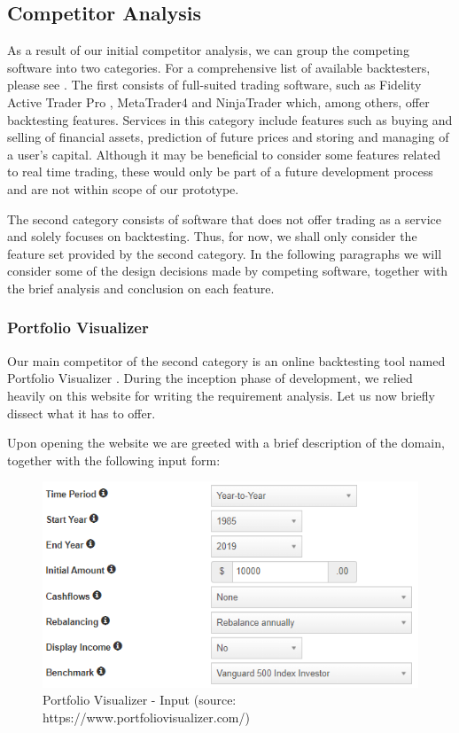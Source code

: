 \documentclass[main.tex]{subfiles}
\begin{document}
\subsection{Competitor Analysis}

As a result of our initial competitor analysis, we can group the competing software into two categories. For a comprehensive list of available backtesters, please see \cite{listofbacktesters}. The first consists of full-suited trading software, such as Fidelity Active Trader Pro \cite{Fidelity}, MetaTrader4 \cite{MetaTrader} and NinjaTrader \cite{NinjaTrader} which, among others, offer backtesting features. Services in this category include features such as buying and selling of financial assets, prediction of future prices and storing and managing of a user's capital. Although it may be beneficial to consider some features related to real time trading, these would only be part of a future development process and are not within scope of our prototype.

The second category consists of software that does not offer trading as a service and solely focuses on backtesting. Thus, for now, we shall only consider the feature set provided by the second category. In the following paragraphs we will consider some of the design decisions made by competing software, together with the brief analysis and conclusion on each feature.

\subsubsection{Portfolio Visualizer}
Our main competitor of the second category is an online backtesting tool named Portfolio Visualizer \cite{portfoliovis}. During the inception phase of development, we relied heavily on this website for writing the requirement analysis. Let us now briefly dissect what it has to offer. 

Upon opening the website we are greeted with a brief description of the domain, together with the following input form:

\begin{figure}[H]
   \centering
   \includegraphics[scale=0.8]{02Background/02Pictures/portfolio_visualizer_input_1.png}
   \caption{Portfolio Visualizer - Input (source: https://www.portfoliovisualizer.com/)}
\end{figure}
\end{document}

